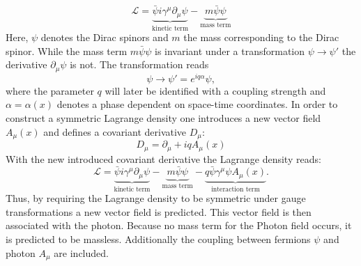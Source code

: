 	\begin{equation}
	\mathcal{L} = \underbrace{\bar{\psi} i \gamma^\mu \partial_\mu \psi}_{\text{kinetic term}} - \underbrace{m \bar{\psi} \psi}_{\text{mass term}}
	\label{eq:qedlag}
	\end{equation}
	Here, $\psi$ denotes the Dirac spinors and $m$ the mass corresponding to the Dirac spinor. While the mass term $m \bar{\psi} \psi$ is invariant under a transformation $\psi \rightarrow \psi'$ the derivative $\partial_\mu \psi$ is not. The transformation reads
	\begin{equation}
	\psi \rightarrow \psi' = e^{i q \alpha} \psi,
	\label{eq:trafo}
	\end{equation}
	where the parameter $q$ will later be identified with a coupling strength and $\alpha = \alpha(x)$ denotes a phase dependent on space-time coordinates. In order to construct a symmetric Lagrange density one introduces a new vector field $A_\mu(x)$ and defines a covariant derivative $D_\mu$:
	\begin{equation}
	D_\mu = \partial_\mu + i q A_\mu(x)
	\end{equation}
	With the new introduced covariant derivative the Lagrange density reads:
	\begin{equation}
	\mathcal{L} = \underbrace{\bar{\psi} i \gamma^\mu \partial_\mu \psi}_{\text{kinetic term}} - \underbrace{m \bar{\psi} \psi}_{\text{mass term}} - \underbrace{q \bar{\psi} \gamma^\mu \psi A_\mu(x)}_{\text{interaction term}}.
	\end{equation}
	Thus, by requiring the Lagrange density to be symmetric under gauge transformations a new vector field is predicted. This vector field is then associated with the photon. Because no mass term for the Photon field occurs, it is predicted to be massless. Additionally the coupling between fermions $\psi$ and photon $A_\mu$ are included.

